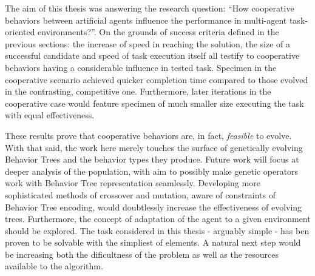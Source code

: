 The aim of this thesis was answering the research question:  ``How cooperative behaviors between artificial agents influence the performance in multi-agent task-oriented environments?''. On the grounds of success criteria defined in the previous sections: the increase of speed in reaching the solution, the size of a successful candidate and speed of task execution itself all testify to cooperative behaviors having a considerable influence in tested task. Specimen in the cooperative scenario achieved quicker completion time compared to those evolved in the contrasting, competitive one. Furthermore, later iterations in the cooperative case would feature specimen of much smaller size executing the task with equal effectiveness.

These results prove that cooperative behaviors are, in fact, \textit{feasible} to evolve.
With that said, the work here merely touches the surface of genetically evolving Behavior Trees and the behavior types they produce. Future work will focus at deeper analysis of the population, with aim to possibly make genetic operators work with Behavior Tree representation seamlessly. Developing more sophisticated methods of crossover and mutation, aware of constraints of Behavior Tree encoding, would doubtlessly increase the effectiveness of evolving trees. Furthermore, the concept of adaptation of the agent to a given environment should be explored. The task considered in this thesis - arguably simple - has ben proven to be solvable with the simpliest of elements. A natural next step would be increasing both the dificultness of the problem as well as the resources available to the algorithm.
